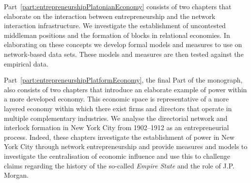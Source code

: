 Part~\ref{part:entrepreneurshipPlatonianEconomy} consists of two chapters that elaborate on the interaction between entrepreneurship and the network interaction infrastructure. We investigate the establishment of uncontested middleman positions and the formation of blocks in relational economies. In elaborating on these concepts we develop formal models and measures to use on network-based data sets. These models and measures are then tested against the empirical data.

Part~\ref{part:entrepreneurshipPlatformEconomy}, the final Part of the monograph, also consists of two chapters that introduce an elaborate example of power within a more developed economy. This economic space is representative of a more layered economy within which there exist firms and directors that operate in multiple complementary industries. We analyse the directorial network and interlock formation in New York City from 1902--1912 as an entrepreneurial process. Indeed, these chapters investigate the establishment of power in New York City through network entrepreneurship and provide measures and models to investigate the centralisation of economic influence and use this to challenge claims regarding the history of the so-called \emph{Empire State} and the role of J.P. Morgan.

